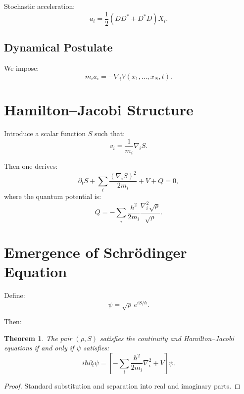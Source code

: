 \documentclass[11pt]{article}
\newtheorem{theorem}{Theorem}
\begin{document}
Stochastic acceleration:
\begin{equation}
a_i = \frac{1}{2}(D D^* + D^* D) X_i.
\end{equation}

\subsection{Dynamical Postulate}

We impose:
\begin{equation}
m_i a_i = - \nabla_i V(x_1,\dots,x_N,t).
\end{equation}

\section{Hamilton--Jacobi Structure}

Introduce a scalar function $S$ such that:
\begin{equation}
v_i = \frac{1}{m_i} \nabla_i S.
\end{equation}

Then one derives:
\begin{equation}
\partial_t S + \sum_i \frac{(\nabla_i S)^2}{2m_i} + V + Q = 0,
\end{equation}
where the quantum potential is:
\begin{equation}
Q = -\sum_i \frac{\hbar^2}{2m_i} \frac{\nabla_i^2 \sqrt{\rho}}{\sqrt{\rho}}.
\end{equation}

\section{Emergence of Schr\"odinger Equation}

Define:
\begin{equation}
\psi = \sqrt{\rho}\, e^{iS/\hbar}.
\end{equation}

Then:
\begin{theorem}
The pair $(\rho,S)$ satisfies the continuity and Hamilton--Jacobi equations if and only if $\psi$ satisfies:
\begin{equation}
i\hbar \partial_t \psi =
\left[
-\sum_i \frac{\hbar^2}{2m_i} \nabla_i^2 + V
\right] \psi.
\end{equation}
\end{theorem}

\begin{proof}
Standard substitution and separation into real and imaginary parts.
\end{proof}
\end{document}
